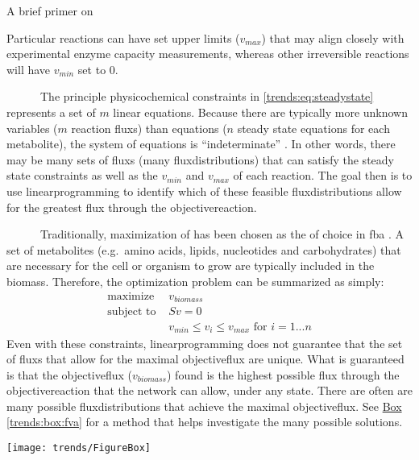 \begin{pabox}[label=trends:box:fba,float*=t,width=\textwidth]{A brief primer on }
\begin{multicols}{2}
Particular reactions can have set upper limits ($v_{max}$) that 
may align closely with experimental enzyme capacity measurements, 
whereas other irreversible reactions will have $v_{min}$ set to 0.

~~~~~~The principle physicochemical constraints in \autoref{trends:eq:steadystate} 
represents a set of $m$ linear equations. 
Because there are typically more unknown variables ($m$ reaction \glspl{flux}) than equations ($n$ steady state
equations for each metabolite), the system of equations is ``indeterminate'' \cite{Lee:2006je}.
In other words, there may be many sets of \glspl{flux} (many \glspl{fluxdistribution}) that 
can satisfy the steady state constraints as well as the $v_{min}$ and $v_{max}$ of each reaction.
The goal then is to use \gls{linearprogramming} to identify which of these feasible \glspl{fluxdistribution}
allow for the greatest \gls{flux} through the \gls{objectivereaction}.

~~~~~~Traditionally, maximization of  has been 
chosen as the  of choice in \gls{fba} \cite{Lee:2006je}. A set 
of metabolites (e.g.\ amino acids, lipids, nucleotides and 
carbohydrates) that are necessary for the cell or organism 
to grow are typically included in the \gls{biomass}. 
Therefore, the optimization problem can be summarized as simply:
\begin{alignat*}{2}
\text{maximize  }   & v_{biomass}  \\
\text{subject to  } & Sv=0 \\
                   & v_{min} \leq v_i \leq v_{max} \text{ for } i=1...n
\end{alignat*}
Even with these constraints, \gls{linearprogramming} does not guarantee that the set of \glspl{flux} that
allow for the maximal \gls{objectiveflux} are unique. What is 
guaranteed is that the \gls{objectiveflux} ($v_{biomass}$) found is the
highest possible \gls{flux} through the \gls{objectivereaction} that the network can allow, under any state.
There are often are many possible \glspl{fluxdistribution} that achieve
the maximal \gls{objectiveflux}. See \hyperref[trends:box:fva]{Box \ref{trends:box:fva}} for
a method that helps investigate the many possible solutions.


  \centering
  \texttt{[image: trends/FigureBox]}
  \label{trends:figbox}

\end{multicols}

\end{pabox}